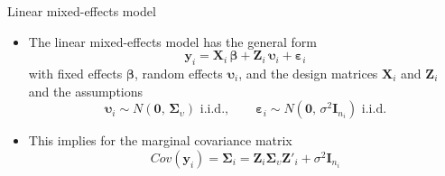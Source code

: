 \documentclass{beamer}
\newcommand{\vect}[1]{\mathbf{#1}}
\newcommand{\mat}[1]{\mathbf{#1}}
\newcommand{\gvect}[1]{\boldsymbol{#1}}
\newcommand{\gmat}[1]{\boldsymbol{#1}}
\begin{document}
\begin{frame}{Linear mixed-effects model}
  \begin{itemize}
    \item The linear mixed-effects model has the general form
\[
  \vect{y}_i = \mat{X}_i \, \gvect{\beta} + \mat{Z}_i \, \gvect{\upsilon}_i +
               \gvect{\varepsilon}_i
\]
with fixed effects $\gvect{\beta}$, random effects
$\gvect{\upsilon}_i$, and the design matrices $\mat{X}_i$ and $\mat{Z}_i$
  and the assumptions
\[
  \gvect{\upsilon}_i \sim N(\vect{0}, \, \gmat{\Sigma}_\upsilon)
    \text{ i.i.d.}, \qquad
  \gvect{\varepsilon}_i \sim N(\vect{0}, \, \sigma^2 \mat{I}_{n_i})
    \text{ i.i.d.}
\]
\item This implies for the marginal covariance matrix
\[
  Cov(\vect{y}_i) = \gmat{\Sigma}_i =
    \mat{Z}_i \gmat{\Sigma}_\upsilon \mat{Z}'_i + \sigma^2 \mat{I}_{n_i}
\]
  \end{itemize}
\end{frame}
\end{document}
